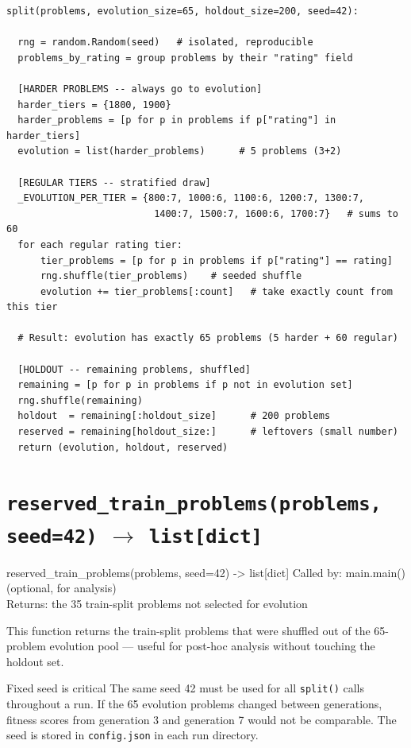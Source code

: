 \documentclass[11pt,a4paper]{report}
\newcommand{\fn}[1]{\texttt{#1}}
\begin{document}
\begin{lstlisting}[style=chain]
split(problems, evolution_size=65, holdout_size=200, seed=42):

  rng = random.Random(seed)   # isolated, reproducible
  problems_by_rating = group problems by their "rating" field

  [HARDER PROBLEMS -- always go to evolution]
  harder_tiers = {1800, 1900}
  harder_problems = [p for p in problems if p["rating"] in harder_tiers]
  evolution = list(harder_problems)      # 5 problems (3+2)

  [REGULAR TIERS -- stratified draw]
  _EVOLUTION_PER_TIER = {800:7, 1000:6, 1100:6, 1200:7, 1300:7,
                          1400:7, 1500:7, 1600:6, 1700:7}   # sums to 60
  for each regular rating tier:
      tier_problems = [p for p in problems if p["rating"] == rating]
      rng.shuffle(tier_problems)    # seeded shuffle
      evolution += tier_problems[:count]   # take exactly count from this tier

  # Result: evolution has exactly 65 problems (5 harder + 60 regular)

  [HOLDOUT -- remaining problems, shuffled]
  remaining = [p for p in problems if p not in evolution set]
  rng.shuffle(remaining)
  holdout  = remaining[:holdout_size]      # 200 problems
  reserved = remaining[holdout_size:]      # leftovers (small number)
  return (evolution, holdout, reserved)
\end{lstlisting}

\section{\fn{reserved\_train\_problems(problems, seed=42)} $\to$ \fn{list[dict]}}

\begin{spec}{reserved\_train\_problems(problems, seed=42) -> list[dict]}
Called by: main.main() (optional, for analysis) \\
Returns: the 35 train-split problems not selected for evolution
\end{spec}

This function returns the train-split problems that were shuffled out of the
65-problem evolution pool --- useful for post-hoc analysis without touching the
holdout set.

\begin{concept}{Fixed seed is critical}
The same seed 42 must be used for all \fn{split()} calls throughout a run.  If the
65 evolution problems changed between generations, fitness scores from generation 3
and generation 7 would not be comparable.  The seed is stored in \fn{config.json}
in each run directory.
\end{concept}
\end{document}
